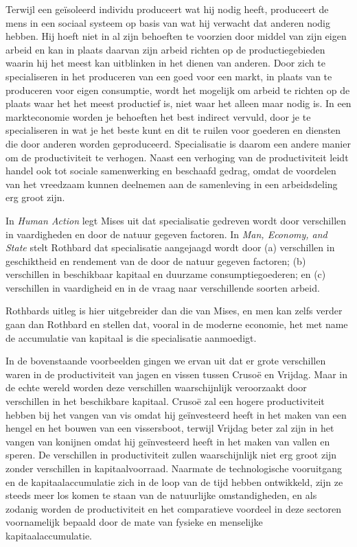 \documentclass[
  a5paper,
  smalldemyvopaper,11pt,twoside,onecolumn,openright,extrafontsizes,
hidelinks]{memoir}
\begin{document}
Terwijl een geïsoleerd individu produceert wat hij nodig heeft,
produceert de mens in een sociaal systeem op basis van wat hij verwacht
dat anderen nodig hebben. Hij hoeft niet in al zijn behoeften te
voorzien door middel van zijn eigen arbeid en kan in plaats daarvan zijn
arbeid richten op de productiegebieden waarin hij het meest kan
uitblinken in het dienen van anderen. Door zich te specialiseren in het
produceren van een goed voor een markt, in plaats van te produceren voor
eigen consumptie, wordt het mogelijk om arbeid te richten op de plaats
waar het het meest productief is, niet waar het alleen maar nodig is. In
een markteconomie worden je behoeften het best indirect vervuld, door je
te specialiseren in wat je het beste kunt en dit te ruilen voor goederen
en diensten die door anderen worden geproduceerd. Specialisatie is
daarom een andere manier om de productiviteit te verhogen. Naast een
verhoging van de productiviteit leidt handel ook tot sociale
samenwerking en beschaafd gedrag, omdat de voordelen van het vreedzaam
kunnen deelnemen aan de samenleving in een arbeidsdeling erg groot zijn.

In \emph{Human Action} legt Mises uit dat specialisatie gedreven wordt
door verschillen in vaardigheden en door de natuur gegeven factoren. In
\emph{Man, Economy, and State} stelt Rothbard dat specialisatie
aangejaagd wordt door (a) verschillen in geschiktheid en rendement van
de door de natuur gegeven factoren; (b) verschillen in beschikbaar
kapitaal en duurzame consumptiegoederen; en (c) verschillen in
vaardigheid en in de vraag naar verschillende soorten arbeid.

Rothbards uitleg is hier uitgebreider dan die van Mises, en men kan
zelfs verder gaan dan Rothbard en stellen dat, vooral in de moderne
economie, het met name de accumulatie van kapitaal is die specialisatie
aanmoedigt.

In de bovenstaande voorbeelden gingen we ervan uit dat er grote
verschillen waren in de productiviteit van jagen en vissen tussen Crusoë
en Vrijdag. Maar in de echte wereld worden deze verschillen
waarschijnlijk veroorzaakt door verschillen in het beschikbare kapitaal.
Crusoë zal een hogere productiviteit hebben bij het vangen van vis omdat
hij geïnvesteerd heeft in het maken van een hengel en het bouwen van een
vissersboot, terwijl Vrijdag beter zal zijn in het vangen van konijnen
omdat hij geïnvesteerd heeft in het maken van vallen en speren. De
verschillen in productiviteit zullen waarschijnlijk niet erg groot zijn
zonder verschillen in kapitaalvoorraad. Naarmate de technologische
vooruitgang en de kapitaalaccumulatie zich in de loop van de tijd hebben
ontwikkeld, zijn ze steeds meer los komen te staan van de natuurlijke
omstandigheden, en als zodanig worden de productiviteit en het
comparatieve voordeel in deze sectoren voornamelijk bepaald door de mate
van fysieke en menselijke kapitaalaccumulatie.
\end{document}
